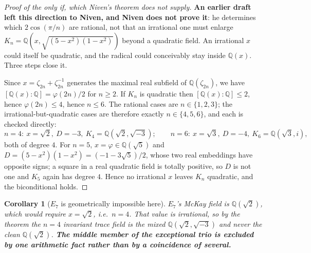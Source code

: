 \documentclass[11pt,reqno]{amsart}
\theoremstyle{plain}
\newtheorem{corollary}[theorem]{Corollary}
\theoremstyle{definition}
\theoremstyle{remark}
\newcommand{\Q}{\mathbb{Q}}
\begin{document}
\begin{proof}[Proof of the \emph{only if}, which Niven's theorem does not supply]
\textbf{An earlier draft left this direction to Niven, and Niven does not prove it}: he
determines which $2\cos(\pi/n)$ are rational, not that an irrational one must enlarge
$K_n=\Q(x,\sqrt{(5-x^2)(1-x^2)})$ beyond a quadratic field. An irrational $x$ could
itself be quadratic, and the radical could conceivably stay inside $\Q(x)$. Three steps
close it.

Since $x=\zeta_{2n}+\zeta_{2n}^{-1}$ generates the maximal real subfield of
$\Q(\zeta_{2n})$, we have $[\Q(x):\Q]=\varphi(2n)/2$ for $n\ge2$. If $K_n$ is quadratic
then $[\Q(x):\Q]\le2$, hence $\varphi(2n)\le4$, hence $n\le6$. The rational cases are
$n\in\{1,2,3\}$; the irrational-but-quadratic cases are therefore exactly
$n\in\{4,5,6\}$, and each is checked directly:
\[
  n=4:\ x=\sqrt2,\ D=-3,\ K_4=\Q(\sqrt2,\sqrt{-3});\qquad
  n=6:\ x=\sqrt3,\ D=-4,\ K_6=\Q(\sqrt3,i),
\]
both of degree $4$. For $n=5$, $x=\varphi\in\Q(\sqrt5)$ and
$D=(5-x^2)(1-x^2)=(-1-3\sqrt5)/2$, whose two real embeddings have opposite signs; a
square in a real quadratic field is totally positive, so $D$ is not one and $K_5$ again
has degree $4$. Hence no irrational $x$ leaves $K_n$ quadratic, and the biconditional
holds.
\end{proof}

\begin{corollary}[$E_7$ is geometrically impossible here]\label{cor:noe7}
$E_7$'s McKay field is $\Q(\sqrt2)$, which would require $x=\sqrt2$, i.e.\ $n=4$. That
value is irrational, so by the theorem the $n=4$ invariant trace field is the \emph{mixed}
$\Q(\sqrt2,\sqrt{-3})$ and never the clean $\Q(\sqrt2)$. \textbf{The middle member of
the exceptional trio is excluded by one arithmetic fact rather than by a coincidence of
several.}
\end{corollary}
\end{document}
